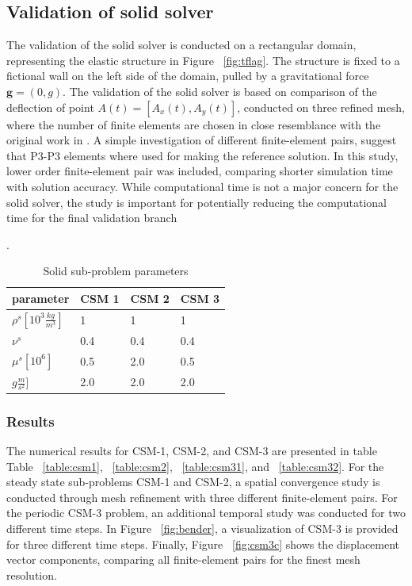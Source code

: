 \subsection{Validation of solid solver}
The validation of the solid solver is conducted on a rectangular domain, representing the elastic structure in Figure ~\ref{fig:tflag}.  The structure is fixed to a fictional wall on the left side of the domain, pulled by a gravitational force $\mathbf{g} = (0, g)$. The validation of the solid solver is based on comparison of the deflection of point $A(t) = [A_x(t), A_y(t)]$,  conducted on three refined mesh, where the number of finite elements are chosen in close resemblance with the original work in \cite{Hron2006}. A simple investigation of different finite-element pairs, suggest that P3-P3 elements where used for making the reference solution. In this study, lower order finite-element pair was included, comparing shorter simulation time with solution accuracy. While computational time is not a major concern for the solid solver, the study is important for potentially reducing the computational time for the final validation branch

\begin{table}[h!]
\centering.
\label{my-label}
\begin{tabular}{ |p{3cm}||p{2cm}|p{2cm}|p{2cm}|  }
 \hline
 parameter              & CSM 1 & CSM 2 & CSM 3 \\
 \hline
$\rho^s [10^{3}\frac{kg}{m^3}]$ & 1    & 1    & 1    \\
$\nu^s $  & 0.4    & 0.4    & 0.4    \\
$\mu^s  [10^{6}]$  & 0.5    & 2.0    & 0.5    \\
$g  \frac{m}{s^2}]$  & 2.0    & 2.0    & 2.0    \\
\hline
\end{tabular}
\caption{Solid sub-problem parameters}
\end{table}

\newpage

\subsubsection*{Results}
The numerical results for CSM-1, CSM-2, and CSM-3 are presented in table Table ~\ref{table:csm1}, ~\ref{table:csm2}, ~\ref{table:csm31}, and ~\ref{table:csm32}. For the steady state sub-problems CSM-1 and CSM-2, a spatial convergence study is conducted through mesh refinement with three different finite-element pairs. For the periodic CSM-3 problem, an additional temporal study was conducted for two different time steps. In Figure ~\ref{fig:bender}, a visualization of CSM-3 is provided for three different time steps. Finally, Figure ~\ref{fig:csm3c} shows the displacement vector components, comparing all finite-element pairs for the finest mesh resolution. \\

